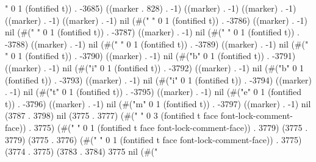 " 0 1 (fontified t)) . -3685) ((marker . 828) . -1) ((marker) . -1) ((marker) . -1) ((marker) . -1) ((marker) . -1) nil (#("	  %
" 0 1 (fontified t)) . -3786) ((marker) . -1) nil (#("	" 0 1 (fontified t)) . -3787) ((marker) . -1) nil (#(" " 0 1 (fontified t)) . -3788) ((marker) . -1) nil (#(" " 0 1 (fontified t)) . -3789) ((marker) . -1) nil (#("\\" 0 1 (fontified t)) . -3790) ((marker) . -1) nil (#("b" 0 1 (fontified t)) . -3791) ((marker) . -1) nil (#("i" 0 1 (fontified t)) . -3792) ((marker) . -1) nil (#("b" 0 1 (fontified t)) . -3793) ((marker) . -1) nil (#("i" 0 1 (fontified t)) . -3794) ((marker) . -1) nil (#("t" 0 1 (fontified t)) . -3795) ((marker) . -1) nil (#("e" 0 1 (fontified t)) . -3796) ((marker) . -1) nil (#("m" 0 1 (fontified t)) . -3797) ((marker) . -1) nil (3787 . 3798) nil (3775 . 3777) (#("	  " 0 3 (fontified t face font-lock-comment-face)) . 3775) (#("
" 0 1 (fontified t face font-lock-comment-face)) . 3779) (3775 . 3779) (3775 . 3776) (#(" " 0 1 (fontified t face font-lock-comment-face)) . 3775) (3774 . 3775) (3783 . 3784) 3775 nil (#("
